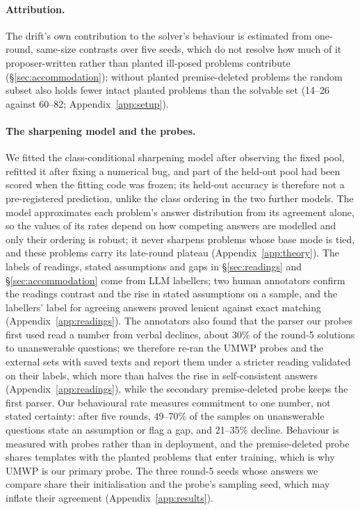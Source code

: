 \paragraph{Attribution.} The drift's own contribution to the solver's behaviour is estimated from one-round, same-size contrasts over five seeds, which do not resolve how much of it proposer-written rather than planted ill-posed problems contribute (\S\ref{sec:accommodation}); without planted premise-deleted problems the random subset also holds fewer intact planted problems than the solvable set (14--26 against 60--82; Appendix~\ref{app:setup}).

\paragraph{The sharpening model and the probes.} We fitted the class-conditional sharpening model after observing the fixed pool, refitted it after fixing a numerical bug, and part of the held-out pool had been scored when the fitting code was frozen; its held-out accuracy is therefore not a pre-registered prediction, unlike the class ordering in the two further models. The model approximates each problem's answer distribution from its agreement alone, so the values of its rates depend on how competing answers are modelled and only their ordering is robust; it never sharpens problems whose base mode is tied, and these problems carry its late-round plateau (Appendix~\ref{app:theory}). The labels of readings, stated assumptions and gaps in \S\ref{sec:readings} and \S\ref{sec:accommodation} come from LLM labellers; two human annotators confirm the readings contrast and the rise in stated assumptions on a sample, and the labellers' label for agreeing answers proved lenient against exact matching (Appendix~\ref{app:readings}). The annotators also found that the parser our probes first used read a number from verbal declines, about 30\% of the round-5 solutions to unanswerable questions; we therefore re-ran the UMWP probes and the external sets with saved texts and report them under a stricter reading validated on their labels, which more than halves the rise in self-consistent answers (Appendix~\ref{app:readings}), while the secondary premise-deleted probe keeps the first parser. Our behavioural rate measures commitment to one number, not stated certainty: after five rounds, 49--70\% of the samples on unanswerable questions state an assumption or flag a gap, and 21--35\% decline. Behaviour is measured with probes rather than in deployment, and the premise-deleted probe shares templates with the planted problems that enter training, which is why UMWP is our primary probe. The three round-5 seeds whose answers we compare share their initialisation and the probe's sampling seed, which may inflate their agreement (Appendix~\ref{app:results}).
